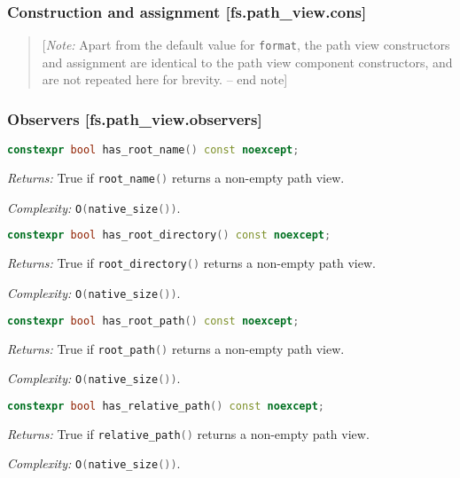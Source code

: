 \documentclass[11pt]{article}
\newcommand{\code}[2][cpp]{\lstinline[language=#1,basicstyle=\small\ttfamily]{#2}}
\newcommand{\desc}[1]{\textit{#1}}
\newcommand{\returns}{\desc{Returns: }}
\newcommand{\complexity}{\desc{Complexity: }}
\newcommand{\note}[1]{\begin{quote}[\textit{Note:} #1 -- end note]\end{quote}}
\begin{document}
\subsubsection*{Construction and assignment [fs.path\_view.cons]}

\color{black}

\note{Apart from the default value for \code{format}, the path view constructors and assignment are identical to the path view component constructors, and are not repeated here for brevity.}

\color{darkgreen}

\subsubsection*{Observers [fs.path\_view.observers]}

\begin{lstlisting}[language=cpp]
    constexpr bool has_root_name() const noexcept;
\end{lstlisting}

\returns True if \code{root_name()} returns a non-empty path view.

\complexity \code{O(native_size())}.\\

\begin{lstlisting}[language=cpp]
    constexpr bool has_root_directory() const noexcept;
\end{lstlisting}

\returns True if \code{root_directory()} returns a non-empty path view.

\complexity \code{O(native_size())}.\\

\begin{lstlisting}[language=cpp]
    constexpr bool has_root_path() const noexcept;
\end{lstlisting}

\returns True if \code{root_path()} returns a non-empty path view.

\complexity \code{O(native_size())}.\\

\begin{lstlisting}[language=cpp]
    constexpr bool has_relative_path() const noexcept;
\end{lstlisting}

\returns True if \code{relative_path()} returns a non-empty path view.

\complexity \code{O(native_size())}.\\
\end{document}
